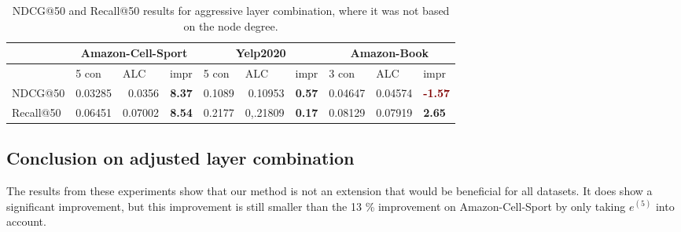 \begin{table*}[h!]
    \centering
    \begin{tabular}{|l|r|r|r||l|r|r||l|l|l|}
        \hline
                  & \multicolumn{3}{c||}{Amazon-Cell-Sport} & \multicolumn{3}{c||}{Yelp2020} & \multicolumn{3}{c|}{Amazon-Book}                                                                                                                                                                  \\ \hline
                  & \multicolumn{1}{l|}{5 con}              & \multicolumn{1}{l|}{ALC}       & \multicolumn{1}{l||}{impr}            & \multicolumn{1}{l|}{5 con} & \multicolumn{1}{l|}{ALC} & \multicolumn{1}{l||}{impr}            & 3 con   & ALC     & impr                                  \\ \hline
        NDCG@50   & 0.03285                                 & 0.0356                         & \textbf{\textcolor{OliveGreen}{8.37}} & 0.1089                     & 0.10953                  & \textbf{\textcolor{OliveGreen}{0.57}} & 0.04647 & 0.04574 & \textbf{\textcolor{Maroon}{-1.57}}    \\ \hline
        Recall@50 & 0.06451                                 & 0.07002                        & \textbf{\textcolor{OliveGreen}{8.54}} & 0.2177                     & 0,.21809                 & \textbf{\textcolor{OliveGreen}{0.17}} & 0.08129 & 0.07919 & \textbf{\textcolor{OliveGreen}{2.65}} \\ \hline
    \end{tabular}
    \caption{NDCG@50 and Recall@50 results for aggressive layer combination, where it was not based on the node degree.}
    \label{tab:aggressive-layer-combination}
\end{table*}

\subsection{Conclusion on adjusted layer combination}
The results from these experiments show that our method is not an extension that would be beneficial for all datasets.
It does show a significant improvement, but this improvement is still smaller than the 13 \% improvement on Amazon-Cell-Sport by only taking $e^{(5)}$ into account.
